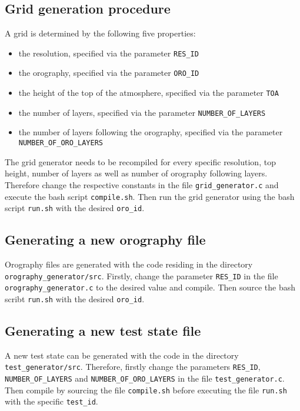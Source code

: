 \documentclass{article}
\begin{document}
\subsection{Grid generation procedure}
\label{sec:grid_generation_procedure}

A grid is determined by the following five properties:

\begin{itemize}
\item the resolution, specified via the parameter \texttt{RES\_ID}
\item the orography, specified via the parameter \texttt{ORO\_ID}
\item the height of the top of the atmosphere, specified via the parameter \texttt{TOA}
\item the number of layers, specified via the parameter \texttt{NUMBER\_OF\_LAYERS}
\item the number of layers following the orography, specified via the parameter \texttt{NUMBER\_OF\_ORO\_LAYERS}
\end{itemize}
%
The grid generator needs to be recompiled for every specific resolution, top height, number of layers as well as number of orography following layers. Therefore change the respective constants in the file \texttt{grid\_generator.c} and execute the bash script \texttt{compile.sh}. Then run the grid generator using the bash script \texttt{run.sh} with the desired \texttt{oro\_id}.

\subsection{Generating a new orography file}
\label{sec:generating_a_new_orography_file}

Orography files are generated with the code residing in the directory \texttt{orography\_generator/src}. Firstly, change the parameter \texttt{RES\_ID} in the file \texttt{orography\_generator.c} to the desired value and compile. Then source the bash scribt \texttt{run.sh} with the desired \texttt{oro\_id}.

\subsection{Generating a new test state file}
\label{sec:generating_a_new_test_state_file}

A new test state can be generated with the code in the directory \texttt{test\_generator/src}. Therefore, firstly change the parameters \texttt{RES\_ID}, \texttt{NUMBER\_OF\_LAYERS} and \texttt{NUMBER\_OF\_ORO\_LAYERS} in the file \texttt{test\_generator.c}. Then compile by sourcing the file \texttt{compile.sh} before executing the file \texttt{run.sh} with the specific \texttt{test\_id}.
\end{document}
